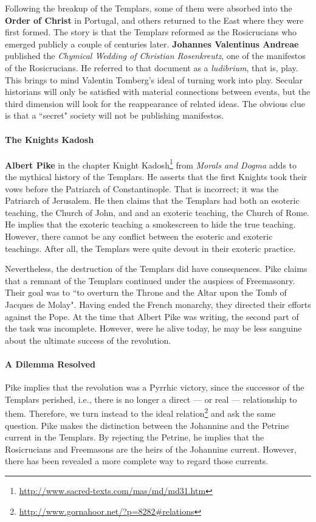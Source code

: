 Following the breakup of the Templars, some of them were absorbed into the \textbf{Order of Christ} in Portugal, and others returned to the East where they were first formed. The story is that the Templars reformed as the Rosicrucians who emerged publicly a couple of centuries later. \textbf{Johannes Valentinus Andreae} published the \emph{Chymical Wedding of Christian Rosenkreutz}, one of the manifestos of the Rosicrucians. He referred to that document as a \emph{ludibrium}, that is, play. This brings to mind Valentin Tomberg's ideal of turning work into play. Secular historians will only be satisfied with material connections between events, but the third dimension will look for the reappearance of related ideas. The obvious clue is that a ``secret" society will not be publishing manifestos.

\paragraph{The Knights Kadosh}
\textbf{Albert Pike} in the chapter Knight Kadosh\footnote{\url{http://www.sacred-texts.com/mas/md/md31.htm}} from \emph{Morals and Dogma} adds to the mythical history of the Templars. He asserts that the first Knights took their vows before the Patriarch of Constantinople. That is incorrect; it was the Patriarch of Jerusalem. He then claims that the Templars had both an esoteric teaching, the Church of John, and and an exoteric teaching, the Church of Rome. He implies that the exoteric teaching a smokescreen to hide the true teaching. However, there cannot be any conflict between the esoteric and exoteric teachings. After all, the Templars were quite devout in their exoteric practice.

Nevertheless, the destruction of the Templars did have consequences. Pike claims that a remnant of the Templars continued under the auspices of Freemasonry. Their goal was to ``to overturn the Throne and the Altar upon the Tomb of Jacques de Molay". Having ended the French monarchy, they directed their efforts against the Pope. At the time that Albert Pike was writing, the second part of the task was incomplete. However, were he alive today, he may be less sanguine about the ultimate success of the revolution.

\paragraph{A Dilemma Resolved}
Pike implies that the revolution was a Pyrrhic victory, since the successor of the Templars perished, i.e., there is no longer a direct — or real — relationship to them. Therefore, we turn instead to the ideal relation\footnote{\url{http://www.gornahoor.net/?p=8282\#relations}} and ask the same question. Pike makes the distinction between the Johannine and the Petrine current in the Templars. By rejecting the Petrine, he implies that the Rosicrucians and Freemasons are the heirs of the Johannine current. However, there has been revealed a more complete way to regard those currents.

